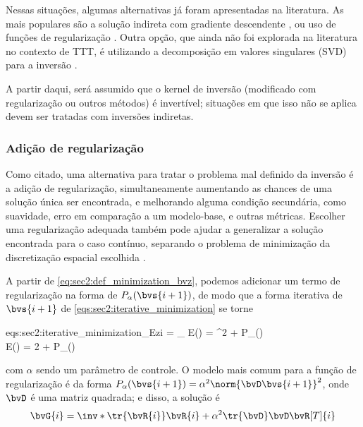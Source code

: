 Nessas situações, algumas alternativas já foram apresentadas na literatura. As mais populares são a solução indireta com gradiente descendente \cite{ali_opensource_2019,hormati_robust_2010,zhang_inversion_2016,tang_travel_2024}, ou uso de funções de regularização \cite{ali_opensource_2019,hormati_robust_2010,tang_travel_2024,zhang_inversion_2016}. Outra opção, que ainda não foi explorada na literatura no contexto de TTT, é utilizando a decomposição em valores singulares (SVD) \cite{barata_moore_2012,golub_calculating_1965} para a inversão \cite{brand_fast_2006,chen_treatment_2006}.

A partir daqui, será assumido que o kernel de inversão (modificado com regularização ou outros métodos) é invertível; situações em que isso não se aplica devem ser tratadas com inversões indiretas.

\subsubsection{Adição de regularização}

Como citado, uma alternativa para tratar o problema mal definido da inversão é a adição de regularização, simultaneamente aumentando as chances de uma solução única ser encontrada, e melhorando alguma condição secundária, como suavidade, erro em comparação a um modelo-base, e outras métricas. Escolher uma regularização adequada também pode ajudar a generalizar a solução encontrada para o caso contínuo, separando o problema de minimização da discretização espacial escolhida \cite{zhang_nonlinear_1998,delprat-jannaud_illposed_1993}.

A partir de \cref{eq:sec2:def_minimization_bvz}, podemos adicionar um termo de regularização na forma de $P_{\alpha}(\bvs{i+1})$, de modo que a forma iterativa de $\bvs{i+1}$ de \cref{eqs:sec2:iterative_minimization} se torne
\begin{subgather}		{eqs:sec2:iterative_minimization_Ezi}
		 = \arg\min_{} E() = ^2 + P_\alpha()\\		
		\nabla E() = 2  + \nabla P_{\alpha}()
\end{subgather}
com $\alpha$ sendo um parâmetro de controle. O modelo mais comum para a função de regularização é da forma $P_{\alpha}(\bvs{i+1}) = \alpha^2\norm{\bvD\bvs{i+1}}^2$, onde $\bvD$ é uma matriz quadrada; e disso, a solução é
\begin{equation}
	\bvG{i} = \inv*{\tr{\bvR{i}} \bvR{i} + \alpha^2 \tr{\bvD}\bvD} \bvR[T]{i}
	\label{eq:sec2:solution_regularization-problem_simple}
\end{equation}

